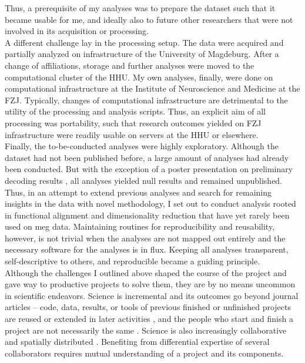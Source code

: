 Thus, a prerequisite of my analyses was to prepare the dataset such that it became usable for me, and ideally also to future other researchers that were not involved in its acquisition or processing.\\
A different challenge lay in the processing setup.
The data were acquired and partially analyzed on infrastructure of the University of Magdeburg.
After a change of affiliations, storage and further analyses were moved to the computational cluster of the \gls{HHU}.
My own analyses, finally, were done on computational infrastructure at the Institute of Neuroscience and Medicine at the \gls{FZJ}.
Typically, changes of computational infrastructure are detrimental to the utility of the processing and analysis scripts.
Thus, an explicit aim of all processing was portability, such that research outcomes yielded on \gls{FZJ} infrastructure were readily usable on servers at the \gls{HHU} or elsewhere.\\
Finally, the to-be-conducted analyses were highly exploratory.
Although the dataset had not been published before, a large amount of analyses had already been conducted.
But with the exception of a poster presentation on preliminary decoding results \citep{kaiserposter}, all analyses yielded null results and remained unpublished.
Thus, in an attempt to extend previous analyses and search for remaining insights in the data with novel methodology, I set out to conduct analysis rooted in functional alignment and dimensionality reduction that have yet rarely been used on \gls{meg} data.
Maintaining routines for reproducibility and reusability, however, is not trivial when the analyses are not mapped out entirely and the necessary software for the analyses is in flux.
Keeping all analyses transparent, self-descriptive to others, and reproducible became a guiding principle.\\
Although the challenges I outlined above shaped the course of the project and gave way to productive projects to solve them, they are by no means uncommon in scientific endeavors.
Science is incremental and its outcomes go beyond journal articles -- code, data, results, or tools of previous finished or unfinished projects are reused or extended in later activities \citep{mons2018data}, and the people who start and finish a project are not necessarily the same \citep{puce2017review}.
Science is also increasingly collaborative and spatially distributed \citep{csomos2020exploring}.
Benefiting from differential expertise of several collaborators requires mutual understanding of a project and its components.
